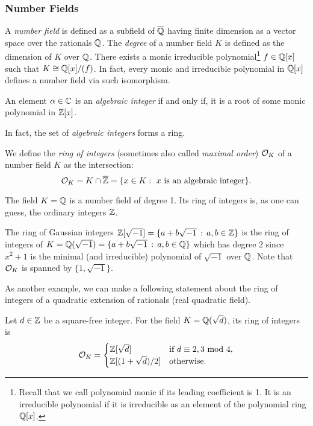 \subsubsection*{Number Fields}
A \textit{number field} is defined as a subfield of $\overline{\mathbb{Q}}$ having finite dimension as a vector space over the rationals $\mathbb{Q}$. The \textit{degree} of a number field $K$ is defined as the dimension of $K$ over $\mathbb{Q}$. There exists a monic irreducible polynomial\footnote{Recall that we call polynomial monic if its leading coefficient is 1. It is an irreducible polynomial if it is irreducible as an element of the polynomial ring $\mathbb{Q}[x]$.} $f \in \mathbb{Q}[x]$ such that $K \cong \mathbb{Q}[x]/(f )$. In fact, every monic and irreducible polynomial in $\mathbb{Q}[x]$ defines a number field via such isomorphism.

\begin{definition}
    An element $\alpha \in \mathbb{C}$ is an \textit{algebraic integer} if and only if, it is a root of some monic polynomial in $\mathbb{Z}[x]$.
\end{definition}
In fact, the set of \textit{algebraic integers} forms a ring.

\begin{definition}
We define the \textit{ring of integers} (sometimes also called \textit{maximal order}) $\mathcal{O}_K$ of a number field $K$ as the intersection:
$$
  \mathcal{O}_K = K \cap \overline{\mathbb{Z}} = \{x \in K : \text{ $x$ is an algebraic integer}\}.
$$
\end{definition}

\begin{example}
    The field $K = \mathbb{Q}$ is a number field of degree 1. Its ring of integers is, as one can guess, the ordinary integers $\mathbb{Z}$.
\end{example}

\begin{example}\label{z-basis}
	The ring of Gaussian integers $\mathbb{Z}[\sqrt{-1}] = \{a+b\sqrt{-1}\, : \, a,b \in \mathbb{Z} \}$ is the ring of integers of $K = \mathbb{Q}(\sqrt{-1}) = \{a + b\sqrt{-1} \, : \, a,b\in \mathbb{Q}\}$ which has degree 2 since $x^2+1$ is the minimal (and irreducible) polynomial of $\sqrt{-1}$ over $\mathbb{Q}$. Note that $\mathcal{O}_K$ is spanned by $\{1, \sqrt{-1} \}$.
\end{example}

As another example, we can make a following statement about the ring of integers of a quadratic extension of rationals (real quadratic field).
\begin{lemma}
     Let $d \in \mathbb{Z}$ be a square-free integer. For the field $K = \mathbb{Q}(\sqrt{d})$, its ring of integers is 
     \[ \mathcal{O}_K = 
	 \begin{cases} 
	     \mathbb{Z}[\sqrt{d}] & \text{if $d \equiv 2, 3 \text{ mod } 4$}, \\
	     \mathbb{Z}[(1 + \sqrt{d})/2] & \text{otherwise}.
     	 \end{cases}
     \]
\end{lemma}

